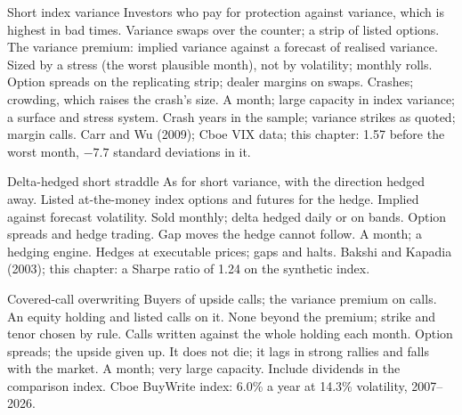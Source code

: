 \begin{strategyfile}{Short index variance}\label{strat:s2:harvesting-the-variance-risk-premium:variance}
 Investors who pay for protection against variance, which is highest in bad times.
 Variance swaps over the counter; a strip of listed options.
 The variance premium: implied variance against a forecast of realised variance.
 Sized by a stress (the worst plausible month), not by volatility; monthly rolls.
 Option spreads on the replicating strip; dealer margins on swaps.
 Crashes; crowding, which raises the crash's size.
 A month; large capacity in index variance; a surface and stress system.
 Crash years in the sample; variance strikes as quoted; margin calls.
 Carr and Wu (2009); Cboe VIX data; this chapter: 1.57 before the worst month, $-7.7$ standard deviations in it.
\end{strategyfile}

\begin{strategyfile}{Delta-hedged short straddle}\label{strat:s2:harvesting-the-variance-risk-premium:straddle}
 As for short variance, with the direction hedged away.
 Listed at-the-money index options and futures for the hedge.
 Implied against forecast volatility.
 Sold monthly; delta hedged daily or on bands.
 Option spreads and hedge trading.
 Gap moves the hedge cannot follow.
 A month; a hedging engine.
 Hedges at executable prices; gaps and halts.
 Bakshi and Kapadia (2003); this chapter: a Sharpe ratio of 1.24 on the synthetic index.
\end{strategyfile}

\begin{strategyfile}{Covered-call overwriting}\label{strat:s2:harvesting-the-variance-risk-premium:overwrite}
 Buyers of upside calls; the variance premium on calls.
 An equity holding and listed calls on it.
 None beyond the premium; strike and tenor chosen by rule.
 Calls written against the whole holding each month.
 Option spreads; the upside given up.
 It does not die; it lags in strong rallies and falls with the market.
 A month; very large capacity.
 Include dividends in the comparison index.
 Cboe BuyWrite index: 6.0\% a year at 14.3\% volatility, 2007--2026.
\end{strategyfile}

